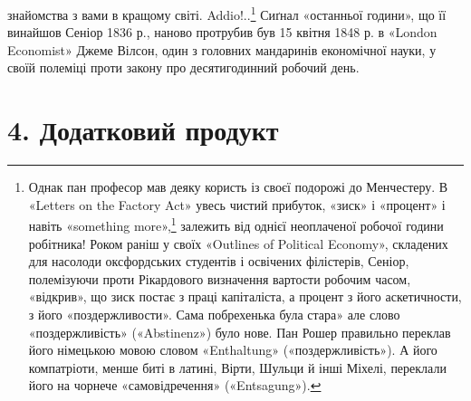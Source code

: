 \parcont{}  %
знайомства з вами в кращому світі. Addio!..\footnote{
Однак пан професор мав деяку користь із своєї подорожі до Менчестеру.
В «Letters on the Factory Act» увесь чистий прибуток, «зиск» і «процент» і
навіть «something more»,\footnote*{
— щось більше. \emph{Ред}.
} залежить від
однієї неоплаченої
робочої години робітника! Роком раніш у своїх «Outlines of Political Economy»,
складених для насолоди оксфордських студентів і освічених філістерів, Сеніор,
полемізуючи проти Рікардового визначення вартости робочим часом, «відкрив», що
зиск постає з праці капіталіста, а процент з його
аскетичности, з його «поздержливости». Сама побрехенька була стара» але слово
«поздержливість» («Abstinenz») було нове. Пан Рошер правильно переклав його
німецькою мовою словом «Enthaltung» («поздержливість»). А його компатріоти,
менше биті в латині, Вірти, Шульци
й інші Міхелі, переклали його на чорнече «самовідречення» («Entsagung»).
} Сиґнал «останньої години», що її винайшов Сеніор 1836 р., наново протрубив
був 15 квітня 1848 р. в «London Economist» Джеме Вілсон, один з головних
мандаринів економічної науки, у своїй полеміці проти
закону про десятигодинний робочий день.

\section*{4. Додатковий продукт}

